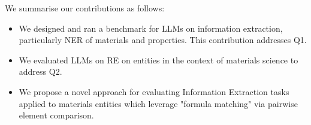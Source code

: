 We summarise our contributions as follows: 

\begin{itemize}
    \item We designed and ran a benchmark for LLMs on information extraction, particularly NER of materials and properties. This contribution addresses Q1. 
    \item We evaluated LLMs on RE on entities in the context of materials science to address Q2.
    \item We propose a novel approach for evaluating Information Extraction tasks applied to materials entities which leverage "formula matching" via pairwise element comparison.
\end{itemize}







